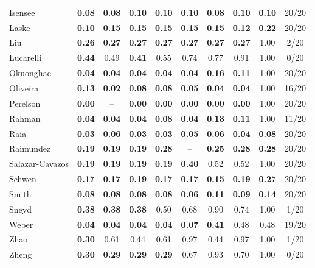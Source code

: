 \begin{longtable}{@{}lccccccccc@{}}
Isensee & \textbf{0.08} & \textbf{0.08} & \textbf{0.10} & \textbf{0.10} & \textbf{0.10} & \textbf{0.08} & \textbf{0.10} & \textbf{0.10} & 20/20 \\
Laske & \textbf{0.10} & \textbf{0.15} & \textbf{0.15} & \textbf{0.15} & \textbf{0.15} & \textbf{0.15} & \textbf{0.12} & \textbf{0.22} & 20/20 \\
Liu & \textbf{0.26} & \textbf{0.27} & \textbf{0.27} & \textbf{0.27} & \textbf{0.27} & \textbf{0.27} & \textbf{0.27} & 1.00 & 2/20 \\
Lucarelli & \textbf{0.44} & 0.49 & \textbf{0.41} & 0.55 & 0.74 & 0.77 & 0.91 & 1.00 & 0/20 \\
Okuonghae & \textbf{0.04} & \textbf{0.04} & \textbf{0.04} & \textbf{0.04} & \textbf{0.04} & \textbf{0.16} & \textbf{0.11} & 1.00 & 20/20 \\
Oliveira & \textbf{0.13} & \textbf{0.02} & \textbf{0.08} & \textbf{0.08} & \textbf{0.05} & \textbf{0.04} & \textbf{0.04} & 1.00 & 16/20 \\
Perelson & \textbf{0.00} & -- & \textbf{0.00} & \textbf{0.00} & \textbf{0.00} & \textbf{0.00} & \textbf{0.00} & 1.00 & 20/20 \\
Rahman & \textbf{0.04} & \textbf{0.04} & \textbf{0.04} & \textbf{0.08} & \textbf{0.04} & \textbf{0.13} & \textbf{0.11} & 1.00 & 11/20 \\
Raia & \textbf{0.03} & \textbf{0.06} & \textbf{0.03} & \textbf{0.03} & \textbf{0.05} & \textbf{0.06} & \textbf{0.04} & \textbf{0.08} & 20/20 \\
Raimundez & \textbf{0.19} & \textbf{0.19} & \textbf{0.19} & \textbf{0.28} & -- & \textbf{0.25} & \textbf{0.28} & \textbf{0.28} & 20/20 \\
Salazar-Cavazos & \textbf{0.19} & \textbf{0.19} & \textbf{0.19} & \textbf{0.19} & \textbf{0.40} & 0.52 & 0.52 & 1.00 & 20/20 \\
Schwen & \textbf{0.17} & \textbf{0.17} & \textbf{0.19} & \textbf{0.17} & \textbf{0.17} & \textbf{0.15} & \textbf{0.19} & \textbf{0.27} & 20/20 \\
Smith & \textbf{0.08} & \textbf{0.08} & \textbf{0.08} & \textbf{0.08} & \textbf{0.06} & \textbf{0.11} & \textbf{0.09} & \textbf{0.14} & 20/20 \\
Sneyd & \textbf{0.38} & \textbf{0.38} & \textbf{0.38} & 0.50 & 0.68 & 0.90 & 0.74 & 1.00 & 1/20 \\
Weber & \textbf{0.04} & \textbf{0.04} & \textbf{0.04} & \textbf{0.04} & \textbf{0.07} & \textbf{0.41} & 0.48 & 0.48 & 19/20 \\
Zhao & \textbf{0.30} & 0.61 & 0.44 & 0.61 & 0.97 & 0.44 & 0.97 & 1.00 & 1/20 \\
Zheng & \textbf{0.30} & \textbf{0.29} & \textbf{0.29} & \textbf{0.29} & 0.67 & 0.93 & 0.70 & 1.00 & 0/20 \\
\bottomrule
\end{longtable}
\endgroup
